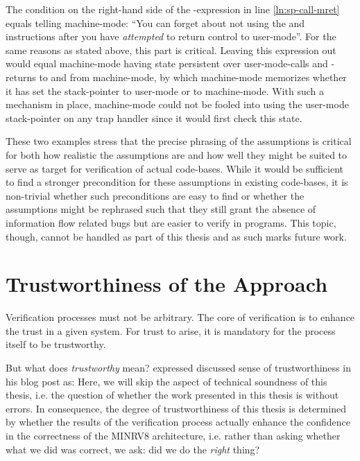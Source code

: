 The condition  on the right-hand side of the -expression in line \ref{ln:sp-call-mret} equals telling machine-mode: \enquote{You can forget about not using the  and  instructions after you have \textit{attempted} to return control to user-mode}.
For the same reasons as stated above, this part is critical.
Leaving this expression out would equal machine-mode having state persistent over user-mode-calls and -returns to and from machine-mode, by which machine-mode memorizes whether it has set the stack-pointer to user-mode or to machine-mode.
With such a mechanism in place, machine-mode could not be fooled into using the user-mode stack-pointer on any trap handler since it would first check this state.

These two examples stress that the precise phrasing of the assumptions is critical for both how realistic the assumptions are and how well they might be suited to serve as target for verification of actual code-bases.
While it would be sufficient to find a stronger precondition for these assumptions in existing code-bases, it is non-trivial whether such preconditions are easy to find or whether the assumptions might be rephrased such that they still grant the absence of information flow related bugs but are easier to verify in programs.
This topic, though, cannot be handled as part of this thesis and as such marks future work.

\section{Trustworthiness of the Approach}
\label{sec:trustworthiness}

Verification processes must not be arbitrary.
The core of verification is to enhance the trust in a given system.
For trust to arise, it is mandatory for the process itself to be trustworthy.

But what does \textit{trustworthy} mean?
\citeauthor{Piano} expressed discussed sense of trustworthiness in his blog post  as:
Here, we will skip the aspect of technical soundness of this thesis, i.e. the question of whether the work presented in this thesis is without errors.
In consequence, the degree of trustworthiness of this thesis is determined by whether the results of the verification process actually enhance the confidence in the correctness of the MINRV8 architecture, i.e. rather than asking whether what we did was correct, we ask: did we do the \textit{right} thing?

